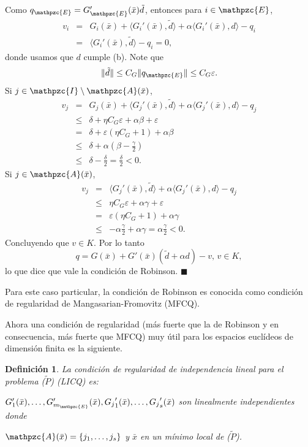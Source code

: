 \documentclass[a4paper,10pt]{book}
\newcommand{\bx}{\bar{x}}
\newcommand{\cI}{\mathpzc{I}}
\newcommand{\cE}{\mathpzc{E}}
\newcommand{\cA}{\mathpzc{A}}
\newcommand{\la}{\langle}
\newcommand{\ra}{\rangle}
\newtheorem{defi}[teo]{Definici\'on}
\newenvironment{dem}{\vspace*{-0.1cm}{\it Demostraci\'on:}}{\hfill
$\blacksquare$\\}
\begin{document}
\begin{dem}
Como $q_\cE=G_\cE'(\bx)\tilde{d}$, entonces para $i\in \cE$,
\begin{eqnarray*}
v_i&=&G_i(\bx)+ \la G_i'(\bx),\tilde{d}\ra +\alpha \la G_i'(\bx),d\ra -q_i\\
&=& \la G_i'(\bx),\tilde{d}\ra -q_i = 0,
\end{eqnarray*}
donde usamos que $d$ cumple (b). Note que
$$\|\tilde{d}\|\leq C_G \|q_\cE\|\leq C_G\varepsilon.$$
Si $j\in \cI\setminus\cA(\bx)$,
\begin{eqnarray*}
v_j&=&G_j(\bx)+\la G_j'(\bx),\tilde{d}\ra + \alpha\la G_j'(\bx),d\ra-q_j\\
&\leq& \delta+\eta C_G\varepsilon+\alpha\beta+\varepsilon\\
&=&\delta + \varepsilon(\eta C_G+1)+\alpha\beta\\
&\leq& \delta + \alpha(\beta-\frac{\gamma}{2})\\
&\leq& \delta -\frac{\delta}{2} =\frac{\delta}{2}<0.
\end{eqnarray*}
Si $j\in \cA(\bx)$,
\begin{eqnarray*}
v_j&=&\la G_j'(\bx),\tilde{d}\ra + \alpha\la G_j'(\bx),d\ra-q_j\\
&\leq& \eta C_G\varepsilon+\alpha\gamma+\varepsilon\\
&=& \varepsilon(\eta C_G+1) + \alpha\gamma \\
&\leq& -\alpha\frac{\gamma}{2} + \alpha\gamma=\alpha\frac{\gamma}{2}<0.
\end{eqnarray*}
Concluyendo que $v\in K$. Por lo tanto 
$$q=G(\bx)+G'(\bx)(\tilde{d}+\alpha d)-v,\,v\in K,$$
lo que dice que vale la condición de Robinson.
\end{dem}

Para este caso particular, la condición de Robinson es conocida como condición de regularidad de Mangasarian-Fromovitz (MFCQ).


Ahora una condición de regularidad (más fuerte que la de Robinson y en consecuencia, más fuerte que MFCQ) muy útil para los espacios euclídeos de dimensión finita es la siguiente.

\begin{defi}
 La condición de regularidad de independencia lineal para el problema ($\tilde{P}$) (LICQ) es:
 
 $G_1'(\bx),\ldots,G_{m_\cE}'(\bx),{G_j}_1'(\bx),\ldots,{G_j}_s'(\bx)$ son linealmente independientes donde
 
 $\cA(\bx)=\{j_1,\ldots,j_s\}$ y $\bx$ en un mínimo local de ($\tilde{P}$).
\end{defi}
\end{document}
